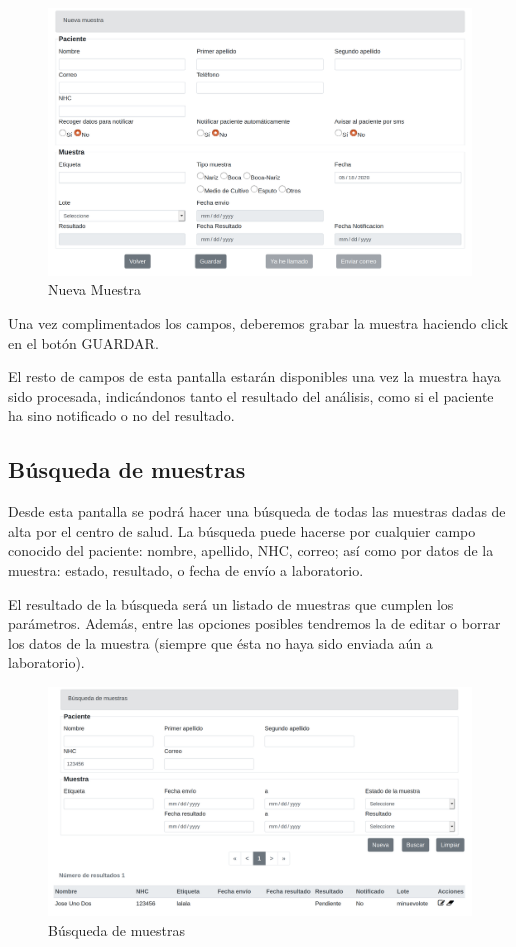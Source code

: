 \documentclass[a4paper,spanish]{paper}
\begin{document}
\begin{figure}[h]
\centering
\includegraphics[scale=0.6]{Figs/Fig3.png}
\caption{Nueva Muestra}
\label{Fig3}
\end{figure}

Una vez complimentados los campos, deberemos grabar la muestra haciendo click en el botón GUARDAR.

El resto de campos de esta pantalla estarán disponibles una vez la muestra haya sido procesada, indicándonos tanto el resultado del análisis, como si el paciente ha sino notificado o no del resultado.

\subsection{Búsqueda de muestras}

Desde esta pantalla se podrá hacer una búsqueda de todas las muestras dadas de alta por el centro de salud. La búsqueda puede hacerse por cualquier campo conocido del paciente: nombre, apellido, NHC, correo; así como por datos de la muestra: estado, resultado, o fecha de envío a laboratorio.

El resultado de la búsqueda será un listado de muestras que cumplen los parámetros. Además, entre las opciones posibles tendremos la de editar o borrar los datos de la muestra (siempre que ésta no haya sido enviada aún a laboratorio).

\begin{figure}[h]
\centering
\includegraphics[scale=0.6]{Figs/Fig4.png}
\caption{Búsqueda de muestras}
\label{Fig4}
\end{figure}
\end{document}

